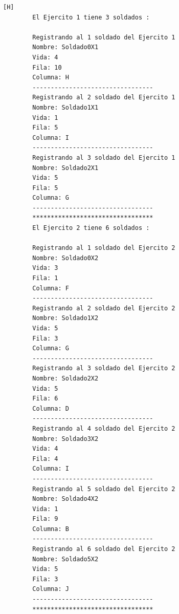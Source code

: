 \documentclass{article}
\begin{document}
	\begin{lstlisting}[language=bash,caption={La ejecución:}][H]
		El Ejercito 1 tiene 3 soldados : 

		Registrando al 1 soldado del Ejercito 1
		Nombre: Soldado0X1
		Vida: 4
		Fila: 10
		Columna: H
		---------------------------------
		Registrando al 2 soldado del Ejercito 1
		Nombre: Soldado1X1
		Vida: 1
		Fila: 5
		Columna: I
		---------------------------------
		Registrando al 3 soldado del Ejercito 1
		Nombre: Soldado2X1
		Vida: 5
		Fila: 5
		Columna: G
		---------------------------------
		*********************************
		El Ejercito 2 tiene 6 soldados : 

		Registrando al 1 soldado del Ejercito 2
		Nombre: Soldado0X2
		Vida: 3
		Fila: 1
		Columna: F
		---------------------------------
		Registrando al 2 soldado del Ejercito 2
		Nombre: Soldado1X2
		Vida: 5
		Fila: 3
		Columna: G
		---------------------------------
		Registrando al 3 soldado del Ejercito 2
		Nombre: Soldado2X2
		Vida: 5
		Fila: 6
		Columna: D
		---------------------------------
		Registrando al 4 soldado del Ejercito 2
		Nombre: Soldado3X2
		Vida: 4
		Fila: 4
		Columna: I
		---------------------------------
		Registrando al 5 soldado del Ejercito 2
		Nombre: Soldado4X2
		Vida: 1
		Fila: 9
		Columna: B
		---------------------------------
		Registrando al 6 soldado del Ejercito 2
		Nombre: Soldado5X2
		Vida: 5
		Fila: 3
		Columna: J
		---------------------------------
		*********************************
	\end{lstlisting}
\end{document}
